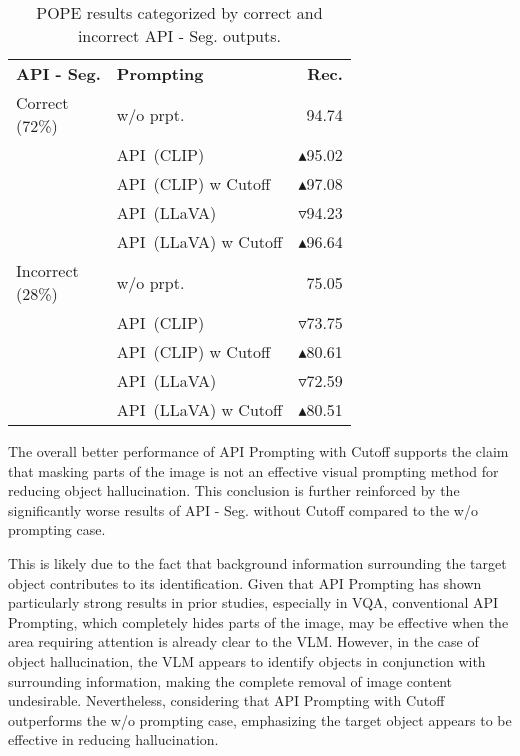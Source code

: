 \begin{table}[t!]
\centering
\begin{tabular}{llr}
\toprule
\textbf{API - Seg.} & \textbf{Prompting} & \textbf{Rec.} \\ \cmidrule(lr){1-3}
\multirowcell{5}{Correct\\(72\%)} & w/o prpt. & 94.74\\
& API~(CLIP)& \ensuremath{\blacktriangle}95.02 \\
& API~(CLIP) w Cutoff & \ensuremath{\blacktriangle}97.08 \\
 & API~(LLaVA) & \ensuremath{\triangledown}94.23  \\
 & API~(LLaVA) w Cutoff & \ensuremath{\blacktriangle}96.64
 \\\cmidrule(lr){1-3}
\multirowcell{5}{Incorrect\\(28\%)} & w/o prpt. & 75.05\\
& API~(CLIP) & \ensuremath{\triangledown}73.75  \\
& API~(CLIP) w Cutoff & \ensuremath{\blacktriangle}80.61  \\
 & API~(LLaVA) & \ensuremath{\triangledown}72.59  \\
 & API~(LLaVA) w Cutoff & \ensuremath{\blacktriangle}80.51 \\
 \bottomrule
\end{tabular}
\caption{POPE results categorized by correct and incorrect API - Seg. outputs.}
\label{table5}
\end{table}

The overall better performance of API Prompting with Cutoff supports the claim that masking parts of the image is not an effective visual prompting method for reducing object hallucination. This conclusion is further reinforced by the significantly worse results of API - Seg. without Cutoff compared to the w/o prompting case.

This is likely due to the fact that background information surrounding the target object contributes to its identification. Given that API Prompting has shown particularly strong results in prior studies, especially in VQA, conventional API Prompting, which completely hides parts of the image, may be effective when the area requiring attention is already clear to the VLM. However, in the case of object hallucination, the VLM appears to identify objects in conjunction with surrounding information, making the complete removal of image content undesirable. Nevertheless, considering that API Prompting with Cutoff outperforms the w/o prompting case, emphasizing the target object appears to be effective in reducing hallucination.  

